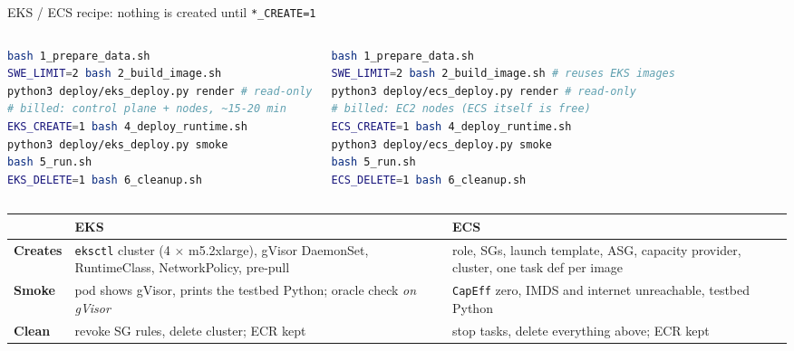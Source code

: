 \begin{frame}[fragile]{EKS / ECS recipe: nothing is created until \texttt{*\_CREATE=1}}
\begin{columns}[T]
\begin{lstlisting}[language=bash]
bash 1_prepare_data.sh
SWE_LIMIT=2 bash 2_build_image.sh
python3 deploy/eks_deploy.py render # read-only
# billed: control plane + nodes, ~15-20 min
EKS_CREATE=1 bash 4_deploy_runtime.sh
python3 deploy/eks_deploy.py smoke
bash 5_run.sh
EKS_DELETE=1 bash 6_cleanup.sh
\end{lstlisting}
\begin{lstlisting}[language=bash]
bash 1_prepare_data.sh
SWE_LIMIT=2 bash 2_build_image.sh # reuses EKS images
python3 deploy/ecs_deploy.py render # read-only
# billed: EC2 nodes (ECS itself is free)
ECS_CREATE=1 bash 4_deploy_runtime.sh
python3 deploy/ecs_deploy.py smoke
bash 5_run.sh
ECS_DELETE=1 bash 6_cleanup.sh
\end{lstlisting}
\end{columns}
\par\vspace{1mm}
\scriptsize
\begin{tabularx}{\textwidth}{@{}>{\bfseries}p{1.5cm}XX@{}}
\toprule
 & \textbf{EKS} & \textbf{ECS}\\
\midrule
Creates & \texttt{eksctl} cluster (4 $\times$ m5.2xlarge), gVisor DaemonSet, RuntimeClass, NetworkPolicy, pre-pull & role, SGs, launch template, ASG, capacity provider, cluster, one task def per image\\
Smoke & pod shows gVisor, prints the testbed Python; oracle check \emph{on gVisor} & \texttt{CapEff} zero, IMDS and internet unreachable, testbed Python\\
Clean & revoke SG rules, delete cluster; ECR kept & stop tasks, delete everything above; ECR kept\\
\bottomrule
\end{tabularx}
\end{frame}


